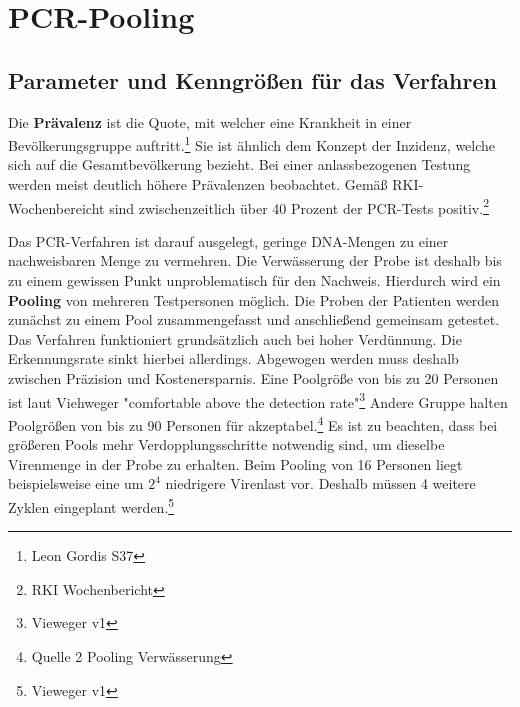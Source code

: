 \cleardoublepage
\chapter{PCR-Pooling}
\section{Parameter und Kenngrößen für das Verfahren}

Die \textbf{Prävalenz} ist die Quote, mit welcher eine Krankheit in einer Bevölkerungsgruppe auftritt.\footnote{Leon Gordis S37}
Sie ist ähnlich dem Konzept der Inzidenz, welche sich auf die Gesamtbevölkerung bezieht.
Bei einer anlassbezogenen Testung werden meist deutlich höhere Prävalenzen beobachtet.
Gemäß RKI-Wochenbereicht sind zwischenzeitlich über 40 Prozent der PCR-Tests positiv.\footnote{RKI Wochenbericht}

Das PCR-Verfahren ist darauf ausgelegt, geringe DNA-Mengen zu einer nachweisbaren Menge zu vermehren.
Die Verwässerung der Probe ist deshalb bis zu einem gewissen Punkt unproblematisch für den Nachweis.
Hierdurch wird ein \textbf{Pooling} von mehreren Testpersonen möglich.
Die Proben der Patienten werden zunächst zu einem Pool zusammengefasst und anschließend gemeinsam getestet.
Das Verfahren funktioniert grundsätzlich auch bei hoher Verdünnung.
Die Erkennungsrate sinkt hierbei allerdings.
Abgewogen werden muss deshalb zwischen Präzision und Kostenersparnis.
Eine Poolgröße von bis zu 20 Personen ist laut Viehweger "comfortable above the detection rate"\footnote{Vieweger v1}
Andere Gruppe halten Poolgrößen von bis zu 90 Personen für akzeptabel.\footnote{Quelle 2 Pooling Verwässerung}
Es ist zu beachten, dass bei größeren Pools mehr Verdopplungsschritte notwendig sind, um dieselbe Virenmenge in der Probe zu erhalten.
Beim Pooling von 16 Personen liegt beispielsweise eine um $2^{4}$ niedrigere Virenlast vor.
Deshalb müssen 4 weitere Zyklen eingeplant werden.\footnote{Vieweger v1}

\cleardoublepage

